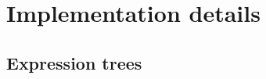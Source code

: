 \documentclass[@BEAMER_OPTIONS@]{beamer}
\begin{document}
\section{Implementation details}

\begin{frame}{}
\end{frame}

\note{ }

\subsection{Expression trees}

\end{document}
